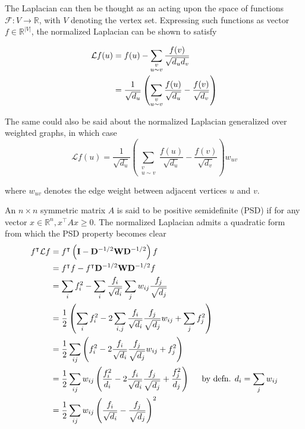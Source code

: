 \documentclass[12pt, oneside, extrafontsizes]{memoir}  %
\def\transpose{\intercal}
\def\laplacian{\mathbf{\mathcal{L}}}
\newcommand{\termidx}[1]{\index{#1}{\textbf{#1}}}
\theoremstyle{plain}
\theoremstyle{definition}
\begin{document}
The Laplacian can then be thought as an \termidx{operator} acting upon the space of
functions $\mathcal{F} : V \to \mathbb{R}$, with $V$ denoting the vertex set.
Expressing such functions as vector $f \in \mathbb{R}^{|V|}$, the normalized Laplacian
can be shown to satisfy
 
\begin{align}
\mathcal{L}f(u) &= f(u) - \sum_{\substack{ v \\ u \sim v}} \frac{f(v)}{\sqrt{d_ud_v}} \notag \\
 &= \frac{1}{\sqrt{d_u}} \left( \sum_{\substack{ v \\ u \sim v}} \frac{f(u)}{\sqrt{d_u}} - \frac{f(v)}{\sqrt{d_v}} \right)
\label{eq:difference-operator}
\end{align}

The same could also be said about the normalized Laplacian generalized over weighted
graphs, in which case
\begin{equation}
\laplacian f (u) = \frac{1}{\sqrt{d_u}} \left( \sum_{\substack{ v \\ u \sim v}} \frac{f(u)}{\sqrt{d_u}} - \frac{f(v)}{\sqrt{d_v}} \right) w_{uv}
\end{equation}

where $w_{uv}$ denotes the edge weight between adjacent vertices $u$ and $v$. 

An $n \times  n$ symmetric matrix $A$ is said to be positive semidefinite (PSD) if for any vector $x \in \mathbb{R}^n, x^\transpose A x \geq 0$.  The normalized Laplacian admits a quadratic form from which the PSD property becomes clear
\begin{align}
f^\transpose \laplacian f &= f^\transpose \left( \mathbf{I} - \mathbf{D}^{-1/2} \mathbf{W} \mathbf{D}^{-1/2} \right) f \notag \\
&= f^\transpose f - f^\transpose \mathbf{D}^{-1/2} \mathbf{W} \mathbf{D}^{-1/2} f \notag \notag \\
&= \sum_{i} f_i^2 - \sum_{i} \frac{f_i}{\sqrt{d_i}} \sum_j w_{ij} \frac{f_j}{\sqrt{d_j}} \notag \\
&= \frac{1}{2} \left( \sum_i f_i^2 - 2 \sum_{i,j} \frac{f_i}{\sqrt{d_i}} \frac{f_j}{\sqrt{d_j}} w_{ij} + \sum_j f_j^2 \right) \notag \\
&= \frac{1}{2} \sum_{ij} \left(  f_i^2 -2\frac{f_i}{\sqrt{d_i}}\frac{f_j}{\sqrt{d_j}} w_{ij}  + f_j^2 \right) \notag \\
&=  \frac{1}{2} \sum_{ij} w_{ij} \left(  \frac{f_i^2}{d_i} -2\frac{f_i}{\sqrt{d_i}}\frac{f_j}{\sqrt{d_j}} + \frac{f_j^2}{d_j} \right) \hspace{5mm} \text{by defn. $d_i = \sum_j w_{ij}$} \notag \\
&= \frac{1}{2} \sum_{ij} w_{ij} \left( \frac{f_i}{\sqrt{d_i}} - \frac{f_j}{\sqrt{d_j}} \right)^2
\label{eq:quadratic-form}
\end{align}
\end{document}
